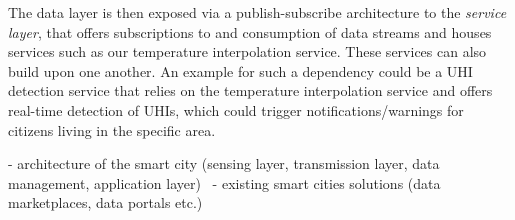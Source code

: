 The data layer is then exposed via a publish-subscribe architecture \cite{bornholdt2019sane} to the \textit{service layer}, that offers subscriptions to and consumption of data streams and houses services such as our temperature interpolation service. These services can also build upon one another. An example for such a dependency could be a UHI detection service that relies on the temperature interpolation service and offers real-time detection of UHIs, which could trigger notifications/warnings for citizens living in the specific area.

- architecture of the smart city (sensing layer, transmission layer, data management, application layer)~\cite{silva2018towards}
- existing smart cities solutions (data marketplaces, data portals etc.)